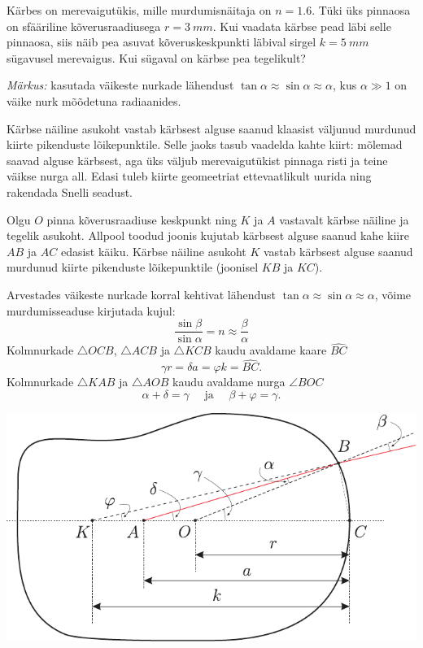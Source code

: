 
Kärbes on merevaigutükis, mille murdumisnäitaja on $n=\num{1,6}$. Tüki üks pinnaosa on sfääriline kõverusraadiusega $r = \SI{3}{mm}$. Kui vaadata kärbse pead läbi selle pinnaosa, siis näib pea asuvat kõveruskeskpunkti läbival sirgel $k = \SI{5}{mm}$ sügavusel merevaigus. Kui sügaval on kärbse pea tegelikult? 

\emph{Märkus:} kasutada väikeste nurkade lähendust $\tan \alpha \approx \sin \alpha \approx \alpha$, kus $\alpha \gg 1$ on väike nurk mõõdetuna radiaanides.

\hint
Kärbse näiline asukoht vastab kärbsest alguse saanud klaasist väljunud murdunud kiirte pikenduste lõikepunktile. Selle jaoks tasub vaadelda kahte kiirt: mõlemad saavad alguse kärbsest, aga üks väljub merevaigutükist pinnaga risti ja teine väikse nurga all. Edasi tuleb kiirte geomeetriat ettevaatlikult uurida ning rakendada Snelli seadust.

\solu
Olgu $O$ pinna kõverusraadiuse keskpunkt ning $K$ ja $A$ vastavalt kärbse näiline ja tegelik asukoht. Allpool toodud joonis kujutab kärbsest alguse saanud kahe kiire $AB$ ja $AC$ edasist käiku. Kärbse näiline asukoht $K$ vastab kärbsest alguse saanud murdunud kiirte pikenduste lõikepunktile (joonisel $KB$ ja $KC$).

Arvestades väikeste nurkade korral kehtivat lähendust $\tan \alpha \approx \sin \alpha \approx \alpha$, võime murdumisseaduse kirjutada kujul:
\[
\frac{\sin \beta}{\sin \alpha}=n \approx \frac{\beta}{\alpha}
\]
Kolmnurkade $\triangle OCB$, $\triangle ACB$ ja $\triangle KCB$ kaudu avaldame kaare $\widehat{BC}$
\[
\gamma r=\delta a=\varphi k=\widehat{BC}.
\]
Kolmnurkade $\triangle KAB$ ja $\triangle AOB$ kaudu avaldame nurga $\angle BOC$
\[
\alpha+\delta=\gamma \quad \text { ja } \quad \beta+\varphi=\gamma.
\]

\begin{center}
	\includegraphics[width=\linewidth]{2008-v2g-10-lah}
\end{center}

